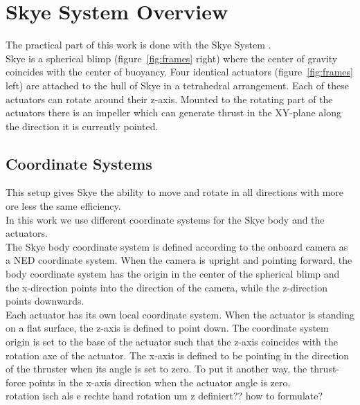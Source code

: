 \section{Skye System Overview}
The practical part of this work is done with the Skye System \citep{Skye2013}.\\
Skye is a spherical blimp (figure~\ref{fig:frames} right) where the center of gravity coincides with the center of buoyancy.
Four identical actuators (figure~\ref{fig:frames} left) are attached to the hull of Skye in a tetrahedral arrangement.
Each of these actuators can rotate around their z-axis.
Mounted to the rotating part of the actuators there is an impeller which can generate thrust in the XY-plane along the direction it is currently pointed.\\
\subsection{Coordinate Systems}
This setup gives Skye the ability to move and rotate in all directions with more ore less the same efficiency.\\
In this work we use different coordinate systems for the Skye body and the actuators.\\
The Skye body coordinate system is defined according to the onboard camera as a NED coordinate system. 
When the camera is upright and pointing forward, the body coordinate system has the origin in the center of the spherical blimp and the x-direction points into the direction of the camera, while the z-direction points downwards.\\
Each actuator has its own local coordinate system.
When the actuator is standing on a flat surface, the z-axis is defined to point down.
The coordinate system origin is set to the base of the actuator such that the z-axis coincides with the rotation axe of the actuator.
The x-axis is defined to be pointing in the direction of the thruster when its angle is set to zero.
To put it another way, the thrust-force points in the x-axis direction when the actuator angle is zero.\\
rotation isch als e rechte hand rotation um z definiert?? how to formulate?

